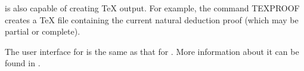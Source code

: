 \documentclass[10pt,twoside]{book}
\begin{document}
{\TPS} is also capable of creating {\TeX} output.
For example, the command {\indexcommand TEXPROOF} creates
a {\TeX} file containing the current natural deduction
proof (which may be partial or complete).

The user interface for {\TPS} is the same as that for {\ETPS}. More 
information about it can be found in \cite{Andrews2004b}.























\newpage
{}
\printindex  
\end{document}
